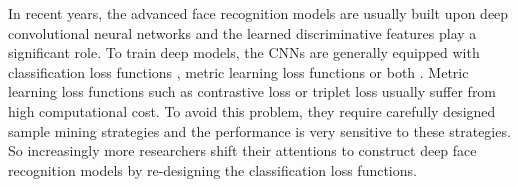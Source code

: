 \documentclass[10pt,twocolumn,letterpaper]{article}
\begin{document}
In recent years, the advanced face recognition models are usually built upon deep convolutional neural networks \cite{Attention56,Resnet,VGG} and the learned discriminative features play a significant role. To train deep models, the CNNs are generally equipped with classification loss functions \cite{Deepface,NormFace,Center,SM-Softmax,SphereFace,EM-Softmax}, metric learning loss functions \cite{Contrastive,Facenet,Angular} or both \cite{DeePFR,DeepID2+,Center,zheng2018ring}. Metric learning loss functions such as contrastive loss \cite{Contrastive} or triplet loss \cite{Facenet} usually suffer from high computational cost. To avoid this problem, they require carefully designed sample mining strategies and the performance is very sensitive to these strategies. So increasingly more researchers shift their attentions to construct deep face recognition models by re-designing the classification loss functions.
\end{document}
